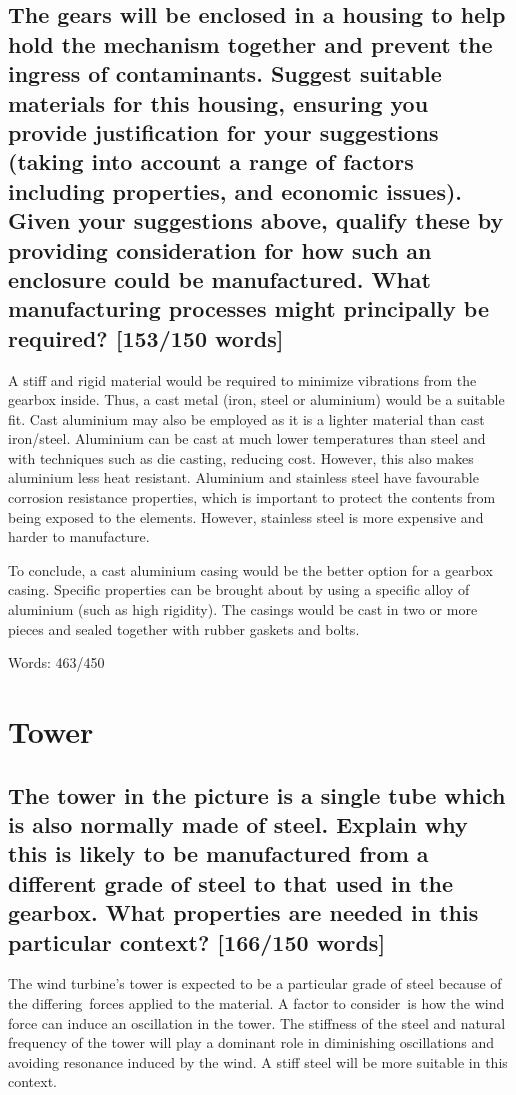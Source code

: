 \documentclass[12pt]{article}
\numberwithin{equation}{section}
\begin{document}
\begin{flushleft}
\subsection[Gearbox casing material.]{The gears will be enclosed in a housing to help hold the mechanism together and prevent the ingress of contaminants. Suggest suitable materials for this housing, ensuring you provide justification for your suggestions (taking into account a range of factors including properties, and economic issues). Given your suggestions above, qualify these by providing consideration for how such an enclosure could be manufactured. What manufacturing processes might principally be required? [153/150 words]}
A stiff and rigid material would be required to minimize vibrations from the gearbox inside. Thus, a cast metal (iron, steel or aluminium) would be a suitable fit. Cast aluminium may also be employed as it is a lighter material than cast iron/steel. Aluminium can be cast at much lower temperatures than steel and with techniques such as die casting, reducing cost. However, this also makes aluminium less heat resistant. Aluminium and stainless steel have favourable corrosion resistance properties, which is important to protect the contents from being exposed to the elements. However, stainless steel is more expensive and harder to manufacture.

To conclude, a cast aluminium casing would be the better option for a gearbox casing. Specific properties can be brought about by using a specific alloy of aluminium (such as high rigidity). The casings would be cast in two or more pieces and sealed together with rubber gaskets and bolts.

Words: 463/450

\section{Tower}
\subsection[Tower steel.]{The tower in the picture is a single tube which is also normally made of steel. Explain why this is likely to be manufactured from a different grade of steel to that used in the gearbox. What properties are needed in this particular context? [166/150 words]}
The wind turbine’s tower is expected to be a particular grade of steel because of the differing forces applied to the material. A factor to consider is how the wind force can induce an oscillation in the tower. The stiffness of the steel and natural frequency of the tower will play a dominant role in diminishing oscillations and avoiding resonance induced by the wind. A stiff steel will be more suitable in this context. 


\end{flushleft}
\end{document}
